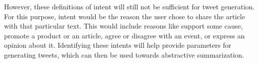 However, these definitions of intent will still not be sufficient for tweet generation. For this purpose, intent would be the reason the user chose to share the article with that particular text. This would include reasons like support some cause, promote a product or an article, agree or disagree with an event, or express an opinion about it. Identifying these intents will help provide parameters for generating tweets, which can then be used towards abstractive summarization. 